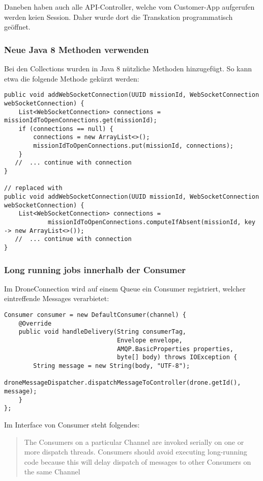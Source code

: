 Daneben haben auch alle API-Controller, welche vom Customer-App aufgerufen werden keien Session.
Daher wurde dort die Transkation programmatisch geöffnet.

\subsubsection{Neue Java 8 Methoden verwenden}
Bei den Collections wurden in Java 8 nützliche Methoden hinzugefügt. So kann etwa die folgende Methode gekürzt werden:

\begin{lstlisting}
public void addWebSocketConnection(UUID missionId, WebSocketConnection webSocketConnection) {
    List<WebSocketConnection> connections = missionIdToOpenConnections.get(missionId);
    if (connections == null) {
        connections = new ArrayList<>();
        missionIdToOpenConnections.put(missionId, connections);
    }
   //  ... continue with connection
}

// replaced with
public void addWebSocketConnection(UUID missionId, WebSocketConnection webSocketConnection) {
    List<WebSocketConnection> connections =
            missionIdToOpenConnections.computeIfAbsent(missionId, key -> new ArrayList<>());
   //  ... continue with connection
}
\end{lstlisting}


\subsubsection{Long running jobs innerhalb der Consumer}
Im DroneConnection wird auf einem Queue ein Consumer registriert, welcher eintreffende Messages verarbietet:
\begin{lstlisting}
Consumer consumer = new DefaultConsumer(channel) {
    @Override
    public void handleDelivery(String consumerTag,
                               Envelope envelope,
                               AMQP.BasicProperties properties,
                               byte[] body) throws IOException {
        String message = new String(body, "UTF-8");
        droneMessageDispatcher.dispatchMessageToController(drone.getId(), message);
    }
};
\end{lstlisting}

Im Interface von Consumer steht folgendes:
\begin{quote} 
The Consumers on a particular Channel are invoked serially on one or more dispatch threads. Consumers should avoid executing long-running code because this will delay dispatch of messages to other Consumers on the same Channel	
\end{quote}

